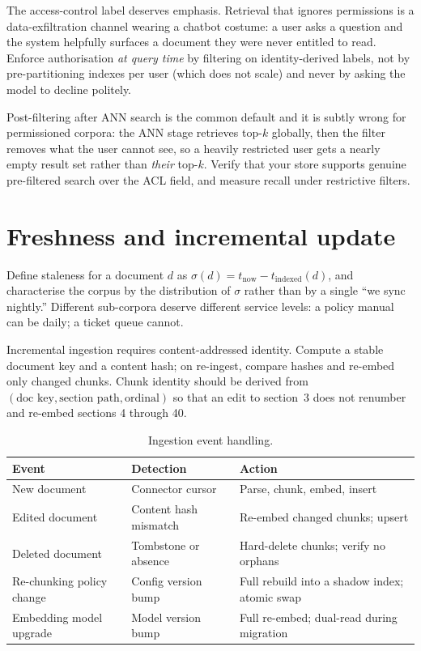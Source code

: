 \documentclass[11pt,twoside,openright]{book}
\theoremstyle{definition}
\theoremstyle{plain}
\theoremstyle{remark}
\begin{document}
The access-control label deserves emphasis. Retrieval that ignores permissions
is a data-exfiltration channel wearing a chatbot costume: a user asks a question
and the system helpfully surfaces a document they were never entitled to read.
Enforce authorisation \emph{at query time} by filtering on identity-derived
labels, not by pre-partitioning indexes per user (which does not scale) and
never by asking the model to decline politely.

\begin{caution}
Post-filtering after ANN search is the common default and it is subtly wrong for
permissioned corpora: the ANN stage retrieves top-$k$ globally, then the filter
removes what the user cannot see, so a heavily restricted user gets a nearly
empty result set rather than \emph{their} top-$k$. Verify that your store
supports genuine pre-filtered search over the ACL field, and measure recall
under restrictive filters.
\end{caution}

\section{Freshness and incremental update}

Define staleness for a document $d$ as
$\sigma(d) = t_{\text{now}} - t_{\text{indexed}}(d)$, and characterise the corpus
by the distribution of $\sigma$ rather than by a single ``we sync nightly.''
Different sub-corpora deserve different service levels: a policy manual can be
daily; a ticket queue cannot.

Incremental ingestion requires content-addressed identity. Compute a stable
document key and a content hash; on re-ingest, compare hashes and re-embed only
changed chunks. Chunk identity should be derived from
$(\text{doc key}, \text{section path}, \text{ordinal})$ so that an edit to
section~3 does not renumber and re-embed sections 4 through 40.

\begin{table}[H]
\centering\footnotesize
\renewcommand{\arraystretch}{1.25}
\begin{tabularx}{\textwidth}{@{}p{4.0cm} p{3.5cm} X@{}}
\toprule
\textbf{Event} & \textbf{Detection} & \textbf{Action} \\
\midrule
New document & Connector cursor & Parse, chunk, embed, insert \\
Edited document & Content hash mismatch & Re-embed changed chunks; upsert \\
Deleted document & Tombstone or absence & Hard-delete chunks; verify no orphans \\
Re-chunking policy change & Config version bump & Full rebuild into a shadow index; atomic swap \\
Embedding model upgrade & Model version bump & Full re-embed; dual-read during migration \\
\bottomrule
\end{tabularx}
\caption{Ingestion event handling.}
\end{table}
\end{document}
